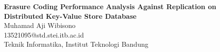 \documentclass[a0,landscape]{config/poster/a0poster}
\begin{document}

\begin{minipage}[c]{0.8\linewidth}
	\veryHuge \textbf{Erasure Coding Performance Analysis Against Replication on Distributed Key-Value Store Database} \\[1.5cm]
	\LARGE {Muhamad Aji Wibisono} \\
	\Large {13521095@std.stei.itb.ac.id} \\
	\Large {Teknik Informatika, Institut Teknologi Bandung}
\end{minipage}

\vspace{1cm} %

\end{document}

